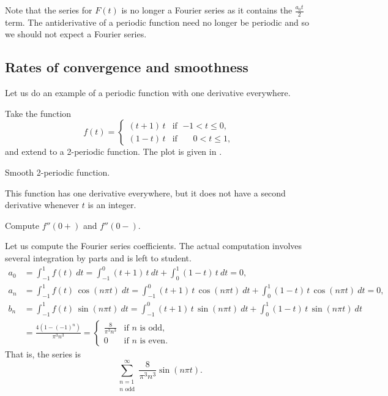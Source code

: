 Note that the series for $F(t)$ is no longer a Fourier series as it contains
the $\frac{a_0 t}{2}$ term.  The antiderivative
of a periodic function need no longer be periodic and so we should not
expect a Fourier series.

\subsection{Rates of convergence and smoothness}

Let us do an example of a periodic function with one derivative everywhere.

\begin{example}
Take the function
\begin{equation*}
f(t) =
\begin{cases}
(t+1)\,t & \text{if } \; {-1} < t \leq 0 , \\
(1-t)\,t & \text{if } \; \phantom{-}0 < t \leq 1 ,
\end{cases}
\end{equation*}
and extend to a
2-periodic function.  The plot is given in
.

\begin{myfig}
\capstart
{}
\caption{Smooth 2-periodic function.\label{gfs:smoothexfig}}
\end{myfig}

This function has one derivative everywhere, but it
does not have a second derivative whenever $t$ is an integer.

\begin{exercise}
Compute $f''(0+)$ and $f''(0-)$.
\end{exercise}

Let us compute the Fourier series coefficients.  The actual computation
involves several integration by parts and is left to student.
\begin{align*}
a_0 & = 
\int_{-1}^1
f(t) ~ dt = 
\int_{-1}^0
(t+1)\,t ~ dt +
\int_0^1
(1-t)\,t ~ dt = 0 , \\
a_n & = 
\int_{-1}^1
f(t) \, \cos (n\pi t) ~ dt = 
\int_{-1}^0
(t+1)\,t
\, \cos (n \pi t) ~ dt +
\int_0^1
(1-t)\,t
\, \cos (n \pi t) ~ dt = 0, \\
b_n & = 
\int_{-1}^1
f(t) \, \sin (n\pi t) ~ dt = 
\int_{-1}^0
(t+1)\,t
\, \sin (n \pi t) ~ dt +
\int_0^1
(1-t)\,t
\, \sin (n \pi t) ~ dt \\
& =
\frac{4 ( 1-{(-1)}^n)}{\pi^3 n^3} 
=
\begin{cases}
\frac{8}{\pi^3 n^3} & \text{if } n \text{ is odd} , \\
0 & \text{if } n \text{ is even} .
\end{cases}
\end{align*}
That is, the series is
\begin{equation*}
\sum_{\substack{n=1 \\ n \text{ odd}}}^\infty \frac{8}{\pi^3 n^3} \sin (n \pi t) .
\end{equation*}


\end{example}
